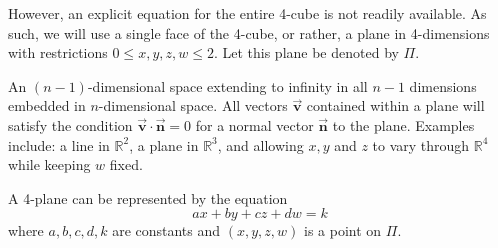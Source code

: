 However, an explicit equation for the entire 4-cube is not readily available. As such, we will use a single face of the 4-cube, or rather, a plane in 4-dimensions with restrictions $0\leq x, y, z, w \leq 2$. Let this plane be denoted by $\Pi$.
\pagebreak
\begin{definition}[$n$-Plane] \label{def:n-plane}
    An $(n-1)$-dimensional space extending to infinity in all $n-1$ dimensions embedded in $n$-dimensional space. All vectors $\Vec{\mathbf{v}}$ contained within a plane will satisfy the condition $\Vec{\mathbf{v}} \cdot \Vec{\mathbf{n}}=0$ for a normal vector $\Vec{\mathbf{n}}$ to the plane. Examples include: a line in $\mathbb{R}^2$, a plane in $\mathbb{R}^3$, and allowing $x,y$ and $z$ to vary through $\mathbb{R}^4$ while keeping $w$ fixed. %
\end{definition}
\begin{lemma}\label{lemma:4-plane equation}
A 4-plane can be represented by the equation \begin{equation}\label{eq:4-plane}
    ax+by+cz+dw=k
\end{equation}
where $a, b, c, d, k$ are constants and $(x, y, z, w)$ is a point on $\Pi$. 
\end{lemma}
